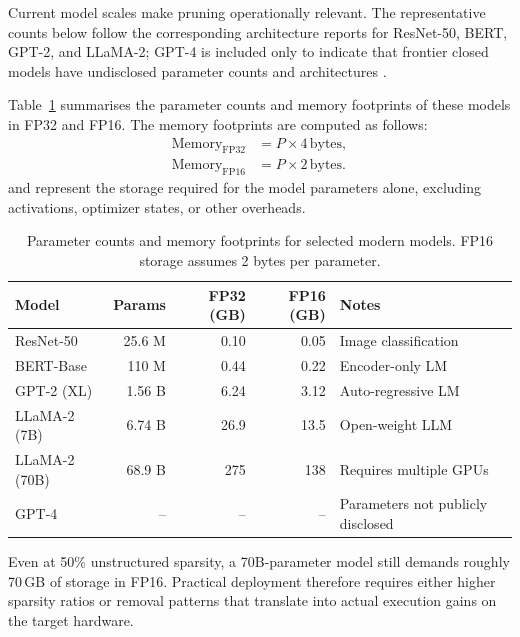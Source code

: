 Current model scales make pruning operationally relevant. The representative
counts below follow the corresponding architecture reports for ResNet-50,
BERT, GPT-2, and LLaMA-2; GPT-4 is included only to indicate that frontier
closed models have undisclosed parameter counts and architectures
\cite{He2016,devlin2019bert,radford2019language,touvron2023llama2,achiam2023gpt}.

Table~\ref{tab:model_sizes} summarises the parameter counts and memory footprints of these models in FP32 and FP16.  The memory footprints are computed as follows:
\begin{align}
	\text{Memory}_{\mathrm{FP32}} &= P \times 4\,\text{bytes}, \\
	\text{Memory}_{\mathrm{FP16}} &= P \times 2\,\text{bytes}.
\end{align}
and represent the storage required for the model parameters alone, excluding activations, optimizer states, or other overheads.
\begin{table}[H]
	\centering
	\caption{Parameter counts and memory footprints for selected modern models.
		FP16 storage assumes 2 bytes per parameter.}
	\label{tab:model_sizes}
	\small
	\renewcommand{\arraystretch}{1.3}
	\begin{tabularx}{\textwidth}{lrrrX}
		\toprule
		\textbf{Model} & \textbf{Params} & \textbf{FP32 (GB)} & \textbf{FP16 (GB)}
		& \textbf{Notes} \\
		\midrule
		ResNet-50          & 25.6 M  & 0.10 & 0.05 & Image classification \\
		BERT-Base          & 110 M   & 0.44 & 0.22 & Encoder-only LM \\
		GPT-2 (XL)        & 1.56 B  & 6.24 & 3.12 & Auto-regressive LM \\
		LLaMA-2 (7B)      & 6.74 B  & 26.9 & 13.5 & Open-weight LLM \\
		LLaMA-2 (70B)     & 68.9 B  & 275  & 138  & Requires multiple GPUs \\
		GPT-4             & --       & --         & --         & Parameters not publicly disclosed \\
		\bottomrule
	\end{tabularx}
\end{table}

Even at 50\% unstructured sparsity, a 70B-parameter model still demands roughly
70\,GB of storage in FP16. Practical deployment therefore requires either
higher sparsity ratios or removal patterns that translate into actual execution
gains on the target hardware.

